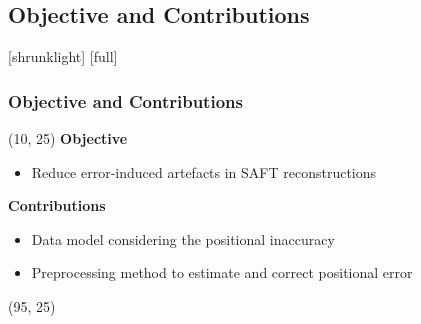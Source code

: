 \documentclass[14pt,compress,aspectratio=169]{beamer} %
\begin{document}
\subsection{Objective and Contributions}
[shrunklight]
[full]
\begin{frame}[t]
\frametitle{Objective and Contributions}
	\begin{textblock}{80}(10, 25) %
	\textbf{Objective} 	
	\begin{itemize}
		\item Reduce error-induced artefacts in SAFT reconstructions
	\end{itemize}
	
	\textbf{Contributions}
	\begin{itemize}
		\item Data model considering the positional inaccuracy 
		\item Preprocessing method to estimate and correct positional error 
	\end{itemize}
	\end{textblock}
	
	\begin{textblock}{50}(95, 25)
	\centering
	\begin{overprint}
	\end{overprint}
	\end{textblock}
	
\end{frame}

\end{document}
